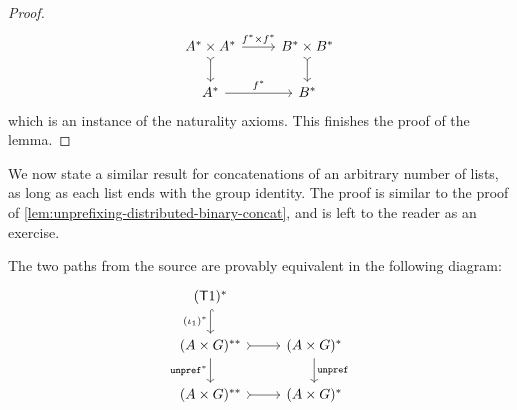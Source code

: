 \begin{proof}
\[
\begin{tikzcd}
A^* \times A^* \ar[r,"f^* \times f^*"]
\ar[d,\concar]
& 
B^* \times B^* 
\ar[d,\concar]
\\
A^* \ar[r,"f^*"]
&
B^*
\end{tikzcd}
\]
which is an instance of the naturality axioms. This finishes the proof of the lemma.
\end{proof}

We now state  a similar result for concatenations of an arbitrary number of lists, as long as each list ends with the group identity. The proof is similar to the proof of \cref{lem:unprefixing-distributed-binary-concat}, and is left to the reader as an exercise.
\begin{lemma}\label{lem:unprefixing-distributed-general-concat}
    The two paths from the source are provably equivalent in the following diagram:
    \[
\begin{tikzcd}
(\functor \groupid)^*
\ar[d, hookrightarrow, "(\iota_\groupid)^*"']
\\
(A \times G)^{**}
\ar[d, "\unprefterm^*"']
\ar[r,\concar]
& 
(A \times G)^*
\ar[d, "\unprefterm"]
\\
(A \times G)^{**}
\ar[r,\concar]
& 
(A \times G)^* 
\end{tikzcd}
\]
\end{lemma}